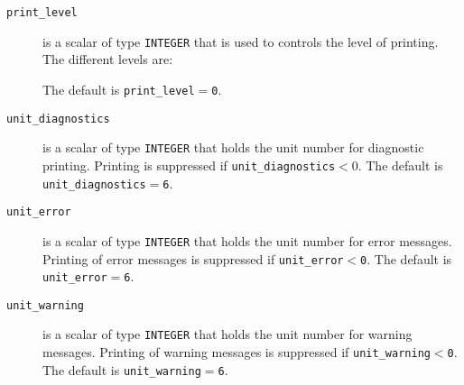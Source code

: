 \documentclass{spral}
\begin{document}
\begin{description}

\item[\texttt{print\_level}] is a scalar of type  {\tt INTEGER}
that is used to controls the level of  printing. The different levels are:
The default is {\tt print\_level$=$\tt 0}.

\item[\texttt{unit\_diagnostics}] is a scalar  of type
{\tt INTEGER} that holds the
unit number for diagnostic printing. Printing is suppressed if
{\tt unit\_diagnostics$<0$}.
The default is {\tt unit\_diagnostics$=$6}.

\item[\texttt{unit\_error}] is a scalar of type  {\tt INTEGER} that holds the
unit number for error messages.
Printing of error messages
is suppressed if {\tt unit\_error$<$0}.
The default is {\tt unit\_error$=$6}.

\item[\texttt{unit\_warning}] is a scalar  of type  {\tt INTEGER} that holds the
unit number for warning messages.
Printing of warning messages is suppressed if {\tt unit\_warning$<$0}.
The default is {\tt unit\_warning$=$6}.

\end{description}



\end{document}
